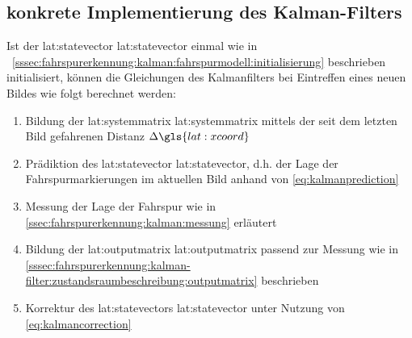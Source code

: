 \subsection{konkrete Implementierung des Kalman-Filters}
Ist der \glsdesc{lat:statevector} \gls{lat:statevector} einmal wie in ~\ref{sssec:fahrspurerkennung:kalman:fahrspurmodell:initialisierung} beschrieben initialisiert, können die Gleichungen des Kalmanfilters bei Eintreffen eines neuen Bildes wie folgt berechnet werden:
\begin{enumerate}
\item Bildung der \glsdesc{lat:systemmatrix} \gls{lat:systemmatrix} mittels der seit dem letzten Bild gefahrenen Distanz \begin{math} \Delta \gls{lat:xcoord} \end{math}
\item Prädiktion des \glsdesc{lat:statevector} \gls{lat:statevector}, d.h. der Lage der Fahrspurmarkierungen im aktuellen Bild anhand von \eqref{eq:kalmanprediction}
\item Messung der Lage der Fahrspur wie in \ref{ssec:fahrspurerkennung:kalman:messung}
erläutert
\item Bildung der \glsdesc{lat:outputmatrix} \gls{lat:outputmatrix} passend zur Messung wie in \ref{sssec:fahrspurerkennung:kalman-filter:zustandsraumbeschreibung:outputmatrix} beschrieben
\item Korrektur des \glsdesc{lat:statevector}s \gls{lat:statevector} unter Nutzung von \eqref{eq:kalmancorrection}
\end{enumerate}



